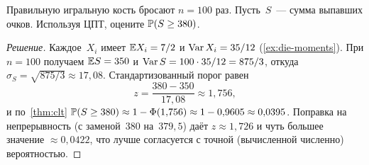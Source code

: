 \begin{problem}
\label{prob:dice-clt}
Правильную игральную кость бросают $n = 100$ раз. Пусть~$S$~--- сумма выпавших очков. Используя ЦПТ, оцените $\mathbb{P}(S \geq 380)$.
\end{problem}

\begin{proof}[Решение]
Каждое~$X_i$ имеет $\mathbb{E} X_i = 7/2$ и $\operatorname{Var} X_i = 35/12$ (\cref{ex:die-moments}). При $n = 100$ получаем $\mathbb{E} S = 350$ и $\operatorname{Var} S = 100 \cdot 35/12 = 875/3$, откуда $\sigma_S = \sqrt{875/3} \approx 17{,}08$. Стандартизованный порог равен
\[
  z = \frac{380 - 350}{17{,}08} \approx 1{,}756,
\]
и по~\cref{thm:clt} $\mathbb{P}(S \geq 380) \approx 1 - \Phi(1{,}756) \approx 1 - 0{,}9605 \approx 0{,}0395$. Поправка на непрерывность (с заменой~$380$ на~$379{,}5$) даёт $z \approx 1{,}726$ и чуть большее значение $\approx 0{,}0422$, что лучше согласуется с точной (вычисленной численно) вероятностью.
\end{proof}
